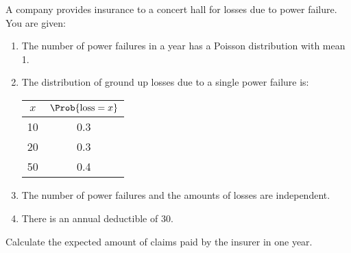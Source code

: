 A company provides insurance to a concert hall for losses due to power 
failure. You are given:
\begin{enumerate}
\item The number of power failures in a year has a Poisson distribution 
 with mean 1.
\item The distribution of ground up losses due to a single power failure is:
\begin{center}\begin{tabular}{c|c}
  $x$ & $\Prob{\mbox{loss}=x}$ \\ \hline
   10 & 0.3 \\
   20 & 0.3 \\
   50 & 0.4
\end{tabular}\end{center}
\item The number of power failures and the amounts of losses are independent.
\item There is an annual deductible of 30.
\end{enumerate}

Calculate the expected amount of claims paid by the insurer in one year.

